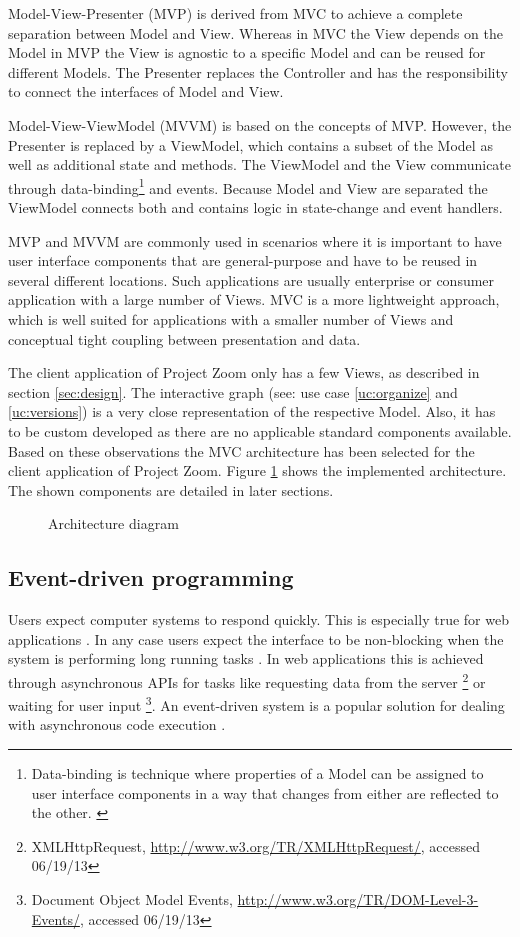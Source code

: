 Model-View-Presenter (MVP) is derived from MVC to achieve a complete separation between Model and View. Whereas in MVC the View depends on the Model in MVP the View is agnostic to a specific Model and can be reused for different Models. The Presenter replaces the Controller and has the responsibility to connect the interfaces of Model and View. 

Model-View-ViewModel (MVVM) is based on the concepts of MVP. However, the Presenter is replaced by a ViewModel, which contains a subset of the Model as well as additional state and methods. The ViewModel and the View communicate through data-binding\footnote{Data-binding is technique where properties of a Model can be assigned to user interface components in a way that changes from either are reflected to the other. \cite{Bent_2004}} and events. Because Model and View are separated the ViewModel connects both and contains logic in state-change and event handlers.

MVP and MVVM are commonly used in scenarios where it is important to have user interface components that are general-purpose and have to be reused in several different locations. Such applications are usually enterprise or consumer application with a large number of Views. MVC is a more lightweight approach, which is well suited for applications with a smaller number of Views and conceptual tight coupling between presentation and data. \cite{Osmani_2012}

The client application of Project Zoom only has a few Views, as described in section \ref{sec:design}. The interactive graph (see: use case \ref{uc:organize} and \ref{uc:versions}) is a very close representation of the respective Model. Also, it has to be custom developed as there are no applicable standard components available. Based on these observations the MVC architecture has been selected for the client application of Project Zoom. Figure \ref{fig:arch} shows the implemented architecture. The shown components are detailed in later sections.

\begin{figure}
\caption{Architecture diagram}
\label{fig:arch}
\end{figure}


\subsection{Event-driven programming}
\label{sec:eventbased}

Users expect computer systems to respond quickly. This is especially true for web applications \cite{Selvidge_1999}. In any case users expect the interface to be non-blocking when the system is performing long running tasks \cite{Nielsen_1994}.  In web applications this is achieved through asynchronous APIs for tasks like requesting data from the server \footnote{XMLHttpRequest, \url{http://www.w3.org/TR/XMLHttpRequest/}, accessed 06/19/13} or waiting for user input \footnote{Document Object Model Events, \url{http://www.w3.org/TR/DOM-Level-3-Events/}, accessed 06/19/13}. An event-driven system is a popular solution for dealing with asynchronous code execution \cite{Michelson_2006}. 

